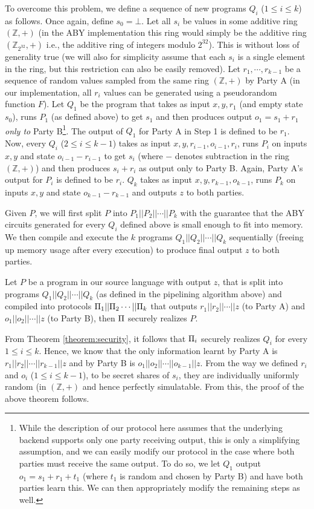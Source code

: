 To overcome this problem, we define a sequence of new programs $Q_i$ ($1\leq i\leq k$) as follows. Once again, define $s_0 = \bot$. Let all $s_i$ be values in some additive ring $(\mathbb{Z},+)$ (in the ABY implementation this ring would simply be the additive ring $(\mathbb{Z}_{2^{32}},+)$ i.e., the additive ring of integers modulo $2^{32}$). This is without loss of generality true (we will also for simplicity assume that each $s_i$ is a single element in the ring, but this restriction can also be easily removed). Let $r_1,\cdots,r_{k-1}$ be a sequence of random values sampled from the same ring $(\mathbb{Z},+)$ by Party A (in our implementation, all $r_i$ values can be generated using a pseudorandom function $F$). Let $Q_1$ be the program that takes as input $x,y, r_1$ (and empty state $s_0$), runs $P_1$ (as defined above) to get $s_1$ and then produces output $o_1 = s_1 + r_1$ {\em only to} Party B\footnote{While the description of our protocol here assumes that the underlying backend supports only one party receiving output, this is only a simplifying assumption, and we can easily modify our protocol in the case where both parties must receive the same output. To do so, we let $Q_1$ output $o_1 = s_1+r_1+t_1$ (where $t_1$ is random and chosen by Party B) and have both parties learn this. We can then appropriately modify the remaining steps as well.}. The output of $Q_1$ for Party A in Step 1 is defined to be $r_1$. Now, every $Q_i$ ($2\leq i\leq k-1$) takes as input $x,y,r_{i-1},o_{i-1},r_i$, runs $P_i$ on inputs $x,y$ and state $o_{i-1}-r_{i-1}$ to get $s_i$ (where $-$ denotes subtraction in the ring $(\mathbb{Z},+)$) and then produces $s_i+r_i$ as output only to Party B. Again, Party A's output for $P_i$ is defined to be $r_i$. $Q_k$ takes as input $x,y,r_{k-1},o_{k-1}$, runs $P_k$ on inputs $x,y$ and state $o_{k-1}-r_{k-1}$ and outputs $z$ to both parties.

Given $P$, we will first split $P$ into $P_1||P_2||\cdots||P_k$ with the guarantee that the ABY circuits generated for every $Q_i$ defined above is small enough to fit into memory. We then compile and execute the $k$ programs $Q_1||Q_2||\cdots||Q_k$ sequentially (freeing up memory usage after every execution) to produce final output $z$ to both parties.

\begin{theorem}
Let $P$ be a program in our source language with output $z$, that is split into programs $Q_1||Q_2||\cdots ||Q_k$ (as defined in the pipelining algorithm above) and compiled into protocols $\Pi_1||\Pi_2\cdots ||\Pi_k$ that outputs $r_1||r_2||\cdots||z$ (to Party A) and $o_1||o_2||\cdots||z$ (to Party B), then $\Pi$ securely realizes $P$.  
\end{theorem}

 From Theorem \ref{theorem:security}, it follows that $\Pi_i$ securely realizes $Q_i$ for every $1\leq i\leq k$. Hence, we know that the only information learnt by Party A is $r_1||r_2||\cdots||r_{k-1}||z$ and by Party B is $o_1||o_2||\cdots||o_{k-1}||z$. From the way we defined $r_i$ and $o_i$ ($1\leq i\leq k-1$), to be secret shares of $s_i$, they are individually uniformly random (in $(\mathbb{Z},+)$ and hence perfectly simulatable. From this, the proof of the above theorem follows.
